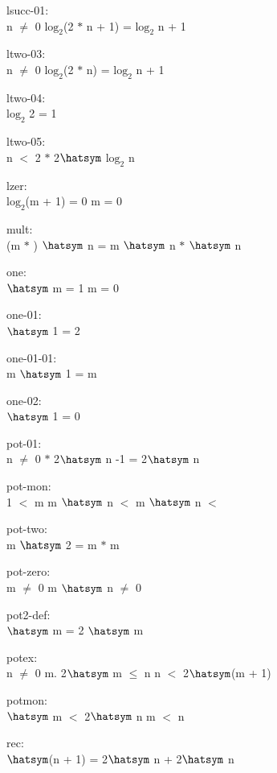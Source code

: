 \documentclass[a4paper]{article}
\begin{document}
lsucc-01:\\ \Fol n $\neq$ 0 \Imp $\mbox{log}_{2}$(2 $*$ n + 1) = $\mbox{log}_{2}$ n + 1

ltwo-03:\\ \Fol n $\neq$ 0 \Imp $\mbox{log}_{2}$(2 $*$ n) = $\mbox{log}_{2}$ n + 1

ltwo-04:\\ \Fol $\mbox{log}_{2}$ 2 = 1

ltwo-05:\\ \Fol n $<$ 2 $*$ 2$\hatsym$ $\mbox{log}_{2}$ n

lzer:\\ \Fol $\mbox{log}_{2}$(m + 1) = 0 \Equiv m = 0

mult:\\ \Fol (m $*$ ) $\hatsym$ n = m $\hatsym$ n $*$  $\hatsym$ n

one:\\ $\hatsym$ m = 1 \Equiv m = 0

one-01:\\ $\hatsym$ 1 = 2

one-01-01:\\ \Fol m $\hatsym$ 1 = m

one-02:\\  $\hatsym$ 1 = 0

pot-01:\\n $\neq$ 0  $*$ 2$\hatsym$ n -1 = 2$\hatsym$ n

pot-mon:\\1 $<$ m \Fol m $\hatsym$ n $<$ m $\hatsym$  \Equiv n $<$ 

pot-two:\\ \Fol m $\hatsym$ 2 = m $*$ m

pot-zero:\\ \Fol m $\neq$ 0 \Imp m $\hatsym$ n $\neq$ 0

pot2-def:\\ $\hatsym$ m = 2 $\hatsym$ m

potex:\\n $\neq$ 0 \Fol \Ex m. 2$\hatsym$ m $\le$ n \And n $<$ 2$\hatsym$(m + 1)

potmon:\\ $\hatsym$ m $<$ 2$\hatsym$ n \Equiv m $<$ n

rec:\\ $\hatsym$(n + 1) = 2$\hatsym$ n + 2$\hatsym$ n
\end{document}
